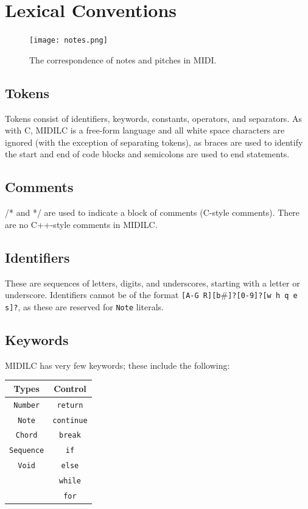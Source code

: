 \documentclass[12pt,A4]{book}
\begin{document}
\section{Lexical Conventions}
\begin{figure}
\center
\texttt{[image: notes.png]}
\label{fig:pitches_and_notes}
\caption{The correspondence of notes and pitches in MIDI. }
\end{figure}
\subsection{Tokens}
Tokens consist of identifiers, keywords, constants, operators, and separators.  As with C, MIDILC is a free-form language and all white space characters are ignored (with the exception of separating tokens), as braces are used to identify the start and end of code blocks and semicolons are used to end statements.
\subsection{Comments}
/* and */ are used to indicate a block of comments (C-style comments).  There are no C++-style comments in MIDILC.
\subsection{Identifiers}
These are sequences of letters, digits, and underscores, starting with a letter or underscore.  Identifiers cannot be of the format \verb|[A-G R][b|\#\verb|]?[0-9]?[w h q e s]?|, as these are reserved for \verb|Note| literals.
\subsection{Keywords}
MIDILC has very few keywords; these include the following:

\begin{tabular}{|c|c|}
\hline
Types & Control \\ \hline
\verb|Number| & \verb|return| \\ \hline
\verb|Note|	& \verb|continue| \\ \hline
\verb|Chord| & \verb|break| \\ \hline
\verb|Sequence|	& \verb|if| \\ \hline
\verb|Void|	& \verb|else| \\ \hline
	& \verb|while| \\ \hline
	& \verb|for| \\ \hline
\end{tabular}
\end{document}
